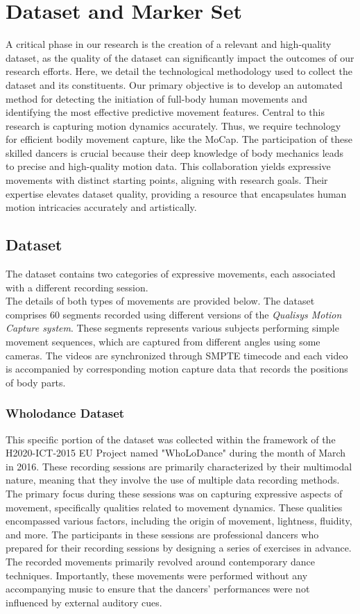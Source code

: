 \section{Dataset and Marker Set}
A critical phase in our research is the creation of a relevant and high-quality dataset, 
as the quality of the dataset can significantly impact the outcomes of our research efforts.
Here, we detail the technological methodology used to collect the dataset and its constituents.
Our primary objective is to develop an automated method for detecting the initiation of full-body human movements and identifying the most effective predictive movement features.
Central to this research is capturing motion dynamics accurately.
Thus, we require technology for efficient bodily movement capture, like the MoCap.
The participation of these skilled dancers is crucial because their deep knowledge of body mechanics leads to precise and high-quality motion data.
This collaboration yields expressive movements with distinct starting points, aligning with research goals.
Their expertise elevates dataset quality, providing a resource that encapsulates human motion intricacies accurately and artistically.


\subsection{Dataset}
The dataset contains two categories of expressive movements, each associated with a different recording session. \\
The details of both types of movements are provided below.
The dataset comprises 60 segments recorded using different versions of the \textit{Qualisys Motion Capture system}.
These segments represents various subjects performing simple movement sequences, which are captured from different angles using some cameras.
The videos are synchronized through SMPTE timecode and each video is accompanied by corresponding motion capture data that records the positions of body parts.


\subsubsection{Wholodance Dataset}
This specific portion of the dataset was collected within the framework of the H2020-ICT-2015 EU Project named "WhoLoDance" 
during the month of March in 2016.
These recording sessions are primarily characterized by their multimodal nature, 
meaning that they involve the use of multiple data recording methods. 
The primary focus during these sessions was on capturing expressive aspects of movement, 
specifically qualities related to movement dynamics. These qualities encompassed various factors, 
including the origin of movement, lightness, fluidity, and more.
The participants in these sessions are professional dancers 
who prepared for their recording sessions by designing a series of exercises in advance. 
The recorded movements primarily revolved around contemporary dance techniques. 
Importantly, these movements were performed without any accompanying music to ensure that 
the dancers' performances were not influenced by external auditory cues.

